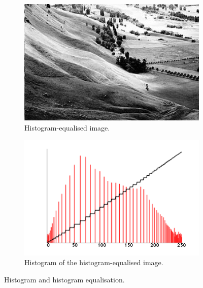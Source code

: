 \documentclass[12pt, twocolumn]{report}
\begin{document}
\begin{figure}[htbp]
\begin{subfigure}{0.4\textwidth}
        \includegraphics[width=1\textwidth]{Figures/Histogram equalisation final image.jpg}
        \caption{Histogram-equalised image.}
        \label{Histogram equalisation final image}
    \end{subfigure}
    \begin{subfigure}{0.4\textwidth}
        \centering
        \includegraphics[width=1\textwidth]{Figures/Histogram equalisation final image histogram.png}
        \caption{Histogram of the histogram-equalised image.}
        \label{Histogram equalisation final image histogram}
    \end{subfigure}
    \caption{Histogram and histogram equalisation.}
    \label{Histogram and histogram equalisation}
\end{figure}
\end{document}
